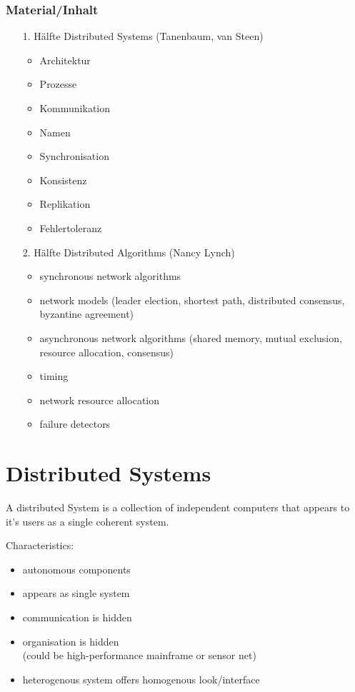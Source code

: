 \documentclass[ngerman,a4paper]{report}
\begin{document}
\subsubsection{Material/Inhalt}
\begin{itemize}
\item[1. Hälfte] Distributed Systems (Tanenbaum, van Steen)
	\begin{itemize}
	\item Architektur
	\item Prozesse
	\item Kommunikation
	\item Namen
	\item Synchronisation
	\item Konsistenz
	\item Replikation
	\item Fehlertoleranz
	\end{itemize}
\item[2. Hälfte] Distributed Algorithms (Nancy Lynch)
	\begin{itemize}
	\item synchronous network algorithms
	\item network models (leader election, shortest path, distributed consensus, byzantine agreement)
	\item asynchronous network algorithms (shared memory, mutual exclusion, resource allocation, consensus)
	\item timing
	\item network resource allocation
	\item failure detectors
	\end{itemize}
\end{itemize}

\section{Distributed Systems}
 A distributed System is a collection of independent computers that appears to it's users as a single coherent system.

Characteristics:\\
\begin{itemize}
\item autonomous components
\item appears as single system
\item communication is hidden
\item organisation is hidden \\(could be high-performance mainframe or sensor net)
\item heterogenous system offers homogenous look/interface
\end{itemize}
\end{document}
